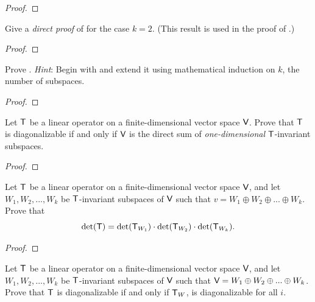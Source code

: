 \begin{proof}
\end{proof}

\begin{exercise} \label{exercise 5.4.33}
Give a \emph{direct proof} of  for the case \(k = 2\).
(This result is used in the proof of .)
\end{exercise}

\begin{proof}
\end{proof}

\begin{exercise} \label{exercise 5.4.34}
Prove .
\emph{Hint}: Begin with  and extend it using mathematical induction on \(k\), the number of subspaces.
\end{exercise}

\begin{proof}
\end{proof}

\begin{exercise} \label{exercise 5.4.35}
Let \(\textsf{T}\) be a linear operator on a finite-dimensional vector space \(\textsf{V}\).
Prove that \(\textsf{T}\) is diagonalizable if and only if \(\textsf{V}\) is the direct sum of \emph{one-dimensional} \(\textsf{T}\)-invariant subspaces.
\end{exercise}

\begin{proof}
\end{proof}

\begin{exercise} \label{exercise 5.4.36}
Let \(\textsf{T}\) be a linear operator on a finite-dimensional vector space \(\textsf{V}\), and let \(W_1, W_2, ..., W_k\) be \(\textsf{T}\)-invariant subspaces of \(\textsf{V}\) such that \(v = W_1 \oplus W_2 \oplus ... \oplus W_k\).
Prove that
\[
    \det(\textsf{T}) = \det(\textsf{T}_{W_1}) \cdot \det(\textsf{T}_{W_2}) \cdot \det(\textsf{T}_{W_k}).
\]
\end{exercise}

\begin{proof}
\end{proof}

\begin{exercise} \label{exercise 5.4.37}
Let \(\textsf{T}\) be a linear operator on a finite-dimensional vector space \(\textsf{V}\), and let \(W_1, W_2, ..., W_k\) be \(\textsf{T}\)-invariant subspaces of \(\textsf{V}\) such that \(\textsf{V} = W_1 \oplus W_2 \oplus ... \oplus W_k\).
Prove that \(\textsf{T}\) is diagonalizable if and only if \(\textsf{T}_W\), is diagonalizable for all \(i\).
\end{exercise}

